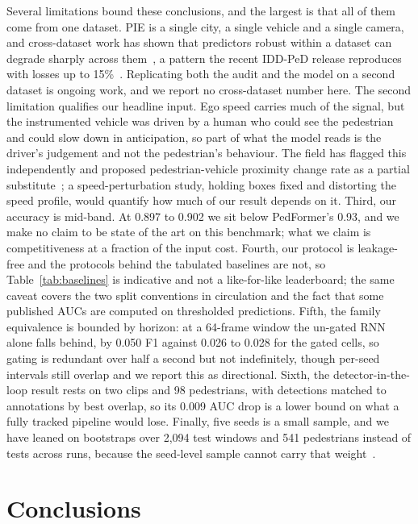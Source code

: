 \documentclass[mti,article,submit,moreauthors]{Definitions/mdpi}
\begin{document}
Several limitations bound these conclusions, and the largest is that all of them come from one dataset. PIE is a single city, a single vehicle and a single camera, and cross-dataset work has shown that predictors robust within a dataset can degrade sharply across them~\citep{gesnouin2022assessing}, a pattern the recent IDD-PeD release reproduces with losses up to 15\%~\citep{bokkasam2025iddped}. Replicating both the audit and the model on a second dataset is ongoing work, and we report no cross-dataset number here. The second limitation qualifies our headline input. Ego speed carries much of the signal, but the instrumented vehicle was driven by a human who could see the pedestrian and could slow down in anticipation, so part of what the model reads is the driver's judgement and not the pedestrian's behaviour. The field has flagged this independently and proposed pedestrian-vehicle proximity change rate as a partial substitute~\citep{azarmi2024featureimportance}; a speed-perturbation study, holding boxes fixed and distorting the speed profile, would quantify how much of our result depends on it. Third, our accuracy is mid-band. At 0.897 to 0.902 we sit below PedFormer's 0.93, and we make no claim to be state of the art on this benchmark; what we claim is competitiveness at a fraction of the input cost. Fourth, our protocol is leakage-free and the protocols behind the tabulated baselines are not, so Table~\ref{tab:baselines} is indicative and not a like-for-like leaderboard; the same caveat covers the two split conventions in circulation and the fact that some published AUCs are computed on thresholded predictions. Fifth, the family equivalence is bounded by horizon: at a 64-frame window the un-gated RNN alone falls behind, by 0.050 F1 against 0.026 to 0.028 for the gated cells, so gating is redundant over half a second but not indefinitely, though per-seed intervals still overlap and we report this as directional. Sixth, the detector-in-the-loop result rests on two clips and 98 pedestrians, with detections matched to annotations by best overlap, so its 0.009 AUC drop is a lower bound on what a fully tracked pipeline would lose. Finally, five seeds is a small sample, and we have leaned on bootstraps over 2,094 test windows and 541 pedestrians instead of tests across runs, because the seed-level sample cannot carry that weight~\citep{bouthillier2021variance}.

\section{Conclusions}
\label{sec:conclusions}
\end{document}
